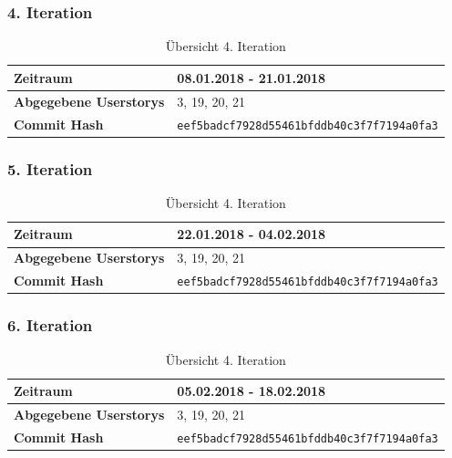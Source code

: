 \documentclass[accentcolor=tud9c,12pt,paper=a4]{tudreport}
\begin{document}
	\subsubsection{4. Iteration}
	\begin{table}[H]
	\begin{center}
		\begin{tabular}{| l | l |}
			\hline
			\textbf{Zeitraum} & 08.01.2018 - 21.01.2018\\\hline
			\textbf{Abgegebene Userstorys} & 3, 19, 20, 21\\\hline
			\textbf{Commit Hash} & \texttt{eef5badcf7928d55461bfddb40c3f7f7194a0fa3} \\\hline
		\end{tabular}
		\caption{Übersicht 4. Iteration}
	\end{center}
	\end{table}

	\subsubsection{5. Iteration}
	\begin{table}[H]
	\begin{center}
		\begin{tabular}{| l | l |}
			\hline
			\textbf{Zeitraum} &  22.01.2018 - 04.02.2018\\\hline
			\textbf{Abgegebene Userstorys} & 3, 19, 20, 21\\\hline
			\textbf{Commit Hash} & \texttt{eef5badcf7928d55461bfddb40c3f7f7194a0fa3} \\\hline
		\end{tabular}
		\caption{Übersicht 4. Iteration}
	\end{center}
	\end{table}

	\subsubsection{6. Iteration}
	\begin{table}[H]
	\begin{center}
		\begin{tabular}{| l | l |}
			\hline
			\textbf{Zeitraum} &  05.02.2018 - 18.02.2018\\\hline
			\textbf{Abgegebene Userstorys} & 3, 19, 20, 21\\\hline
			\textbf{Commit Hash} & \texttt{eef5badcf7928d55461bfddb40c3f7f7194a0fa3} \\\hline
		\end{tabular}
		\caption{Übersicht 4. Iteration}
	\end{center}
	\end{table}
\end{document}
